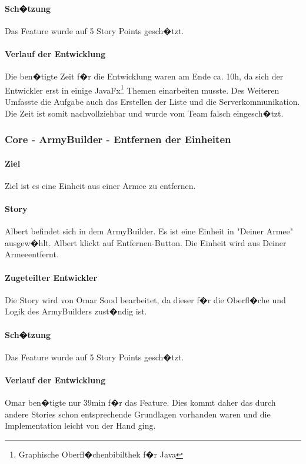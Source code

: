 \documentclass[12pt, titlepage]{scrartcl}
\begin{document}
		\paragraph{Sch�tzung}
		Das Feature wurde auf 5 Story Points gesch�tzt.
		\paragraph{Verlauf der Entwicklung} Die ben�tigte Zeit f�r die Entwicklung waren am Ende ca. 10h, da sich der Entwickler erst in einige JavaFx\footnote{Graphische Oberfl�chenbibilthek f�r Java} Themen einarbeiten musste. Des Weiteren Umfasste die Aufgabe auch das Erstellen der Liste und die Serverkommunikation. Die Zeit ist somit nachvollziehbar und wurde vom Team falsch eingesch�tzt.
		
		\subsubsection{Core - ArmyBuilder - Entfernen der Einheiten}
		\paragraph{Ziel} Ziel ist es eine Einheit aus einer Armee zu entfernen.
		\paragraph{Story} Albert befindet sich in dem ArmyBuilder. Es ist eine Einheit in "Deiner Armee" ausgew�hlt. Albert klickt auf \glqq Entfernen\grqq-Button. Die Einheit wird aus \glqq Deiner Armee\grqq entfernt.
		\paragraph{Zugeteilter Entwickler} Die Story wird von Omar Sood bearbeitet, da dieser f�r die Oberfl�che und Logik des ArmyBuilders zust�ndig ist.
		\paragraph{Sch�tzung}
		Das Feature wurde auf 5 Story Points gesch�tzt.
		\paragraph{Verlauf der Entwicklung} Omar ben�tigte nur 39min f�r das Feature. Dies kommt daher das durch andere Stories schon entsprechende Grundlagen vorhanden waren und die Implementation leicht von der Hand ging.
		
\end{document}
